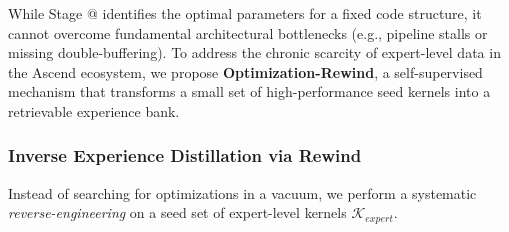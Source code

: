 \documentclass{article}
\makeatletter
\theoremstyle{plain}
\theoremstyle{definition}
\theoremstyle{remark}
\newcommand{\Rmnum}[1]{\expandafter\@slowromancap\romannumeral #1@}
\makeatother
\begin{document}




While Stage \Rmnum{1} identifies the optimal parameters for a fixed code structure, it cannot overcome fundamental architectural bottlenecks (e.g., pipeline stalls or missing double-buffering). To address the chronic scarcity of expert-level data in the Ascend ecosystem, we propose \textbf{Optimization-Rewind}, a self-supervised mechanism that transforms a small set of high-performance seed kernels into a retrievable experience bank.

\subsubsection{Inverse Experience Distillation via Rewind}
Instead of searching for optimizations in a vacuum, we perform a systematic \textit{reverse-engineering} on a seed set of expert-level kernels $\mathcal{K}_{expert}$. 
\end{document}
